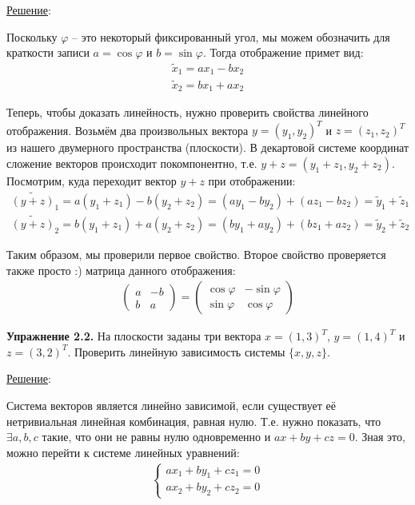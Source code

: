 \documentclass[a4paper, 12pt]{article}
\begin{document}
\begin{spacing}{1.5}
\underline{Решение}:

\setlength{\leftskip}{5ex}
\setlength{\rightskip}{5ex}

Поскольку $\varphi$ -- это некоторый фиксированный угол, мы можем обозначить для краткости записи $a = \cos \varphi$ и $b = \sin \varphi$. Тогда отображение примет вид:
\begin{align*}
    \tilde{x}_1 = a x_1 - b x_2 \\
    \tilde{x}_2 = b x_1 + a x_2
\end{align*}

Теперь, чтобы доказать линейность, нужно проверить свойства линейного отображения. Возьмём два произвольных вектора $y = (y_1, y_2)^T$ и $z = (z_1, z_2)^T$ из нашего двумерного пространства (плоскости). В декартовой системе координат сложение векторов происходит покомпонентно, т.е. $y + z = (y_1 + z_1, y_2 + z_2)$. Посмотрим, куда переходит вектор $y + z$ при отображении:
\begin{align*}
    \widetilde{(y+z)}_1 = a (y_1 + z_1) - b (y_2 + z_2) = (a y_1 - b y_2) + (a z_1 - b z_2) = \tilde{y}_1 + \tilde{z}_1\\
    \widetilde{(y+z)}_2 = b (y_1 + z_1)+ a (y_2 + z_2) = (b y_1 + a y_2) + (b z_1 + a z_2) = \tilde{y}_2 + \tilde{z}_2
\end{align*}

Таким образом, мы проверили первое свойство. Второе свойство проверяется также просто :) матрица данного отображения:
\begin{align*}
\begin{pmatrix}
a & -b \\
b & a 
\end{pmatrix}
=
\begin{pmatrix}
\cos \varphi & - \sin \varphi \\
\sin \varphi & \cos \varphi
\end{pmatrix}
\end{align*}

\setlength{\leftskip}{0ex}
\setlength{\rightskip}{0ex}

\textbf{Упражнение 2.2.} На плоскости заданы три вектора $x = (1, 3)^T$, $y = (1, 4)^T$ и $z = (3, 2)^T$. Проверить линейную зависимость системы $\{x, y, z\}$.

\underline{Решение}:

\setlength{\leftskip}{5ex}
\setlength{\rightskip}{5ex}

 Система векторов является линейно зависимой, если существует её нетривиальная линейная комбинация, равная нулю. Т.е. нужно показать, что $\exists a, b, c$ такие, что они не равны нулю одновременно и $ax + by + cz = 0$. Зная это, можно перейти к системе линейных уравнений:
 \begin{align*}
 \begin{cases}
    a x_1 + b y_1 + c z_1 = 0 \\
    a x_2 + b y_2 + c z_2 = 0
\end{cases}
\end{align*}


\end{spacing}
\end{document}
